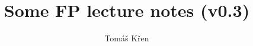 \documentclass[a4paper,oneside]{memoir}
\title{Some FP lecture notes (v0.3)}
\author{Tomáš Křen}
\begin{document}
\theoremstyle{plain} 
\newtheorem{theorem}{Theorem} 
\newtheorem{proposition}{Proposition} 
\newtheorem{lemma}{Lemma} 
\newtheorem{preLemma}{Pre-Lemma} 
\newtheorem*{corollary}{Corollary}

\theoremstyle{definition} 
\newtheorem*{definition}{Definition} 
\newtheorem*{preDefinition}{Pre-Definition} 
\newtheorem{conjecture}{Conjecture}
\newtheorem*{example}{Example} 

\theoremstyle{remark} 
\newtheorem*{remark}{Remark} 
\newtheorem*{note}{Note} 
\newtheorem{case}{Case}

\frontmatter
\mainmatter
\maketitle


\tableofcontents*

\newcommand{\red}[1]{{\color{red} #1}}



\newcommand{\sigmaPr}{\sigma^\prime}
\newcommand{\tauPr}{\tau^\prime}
\newcommand{\xPr}{x^\prime}
\newcommand{\nPr}{n^\prime}
\newcommand{\nPrr}{n^{\prime\prime}}
\newcommand{\nPrrr}{n^{\prime\prime\prime}}
\newcommand{\tausPr}{\tau_s^\prime}
\newcommand{\s}{\sigma}
\newcommand{\Th}{\theta}
\newcommand{\sPr}{\sigmaPr}
\newcommand{\thPr}{\theta^\prime}



\newcommand{\then}{\Rightarrow}
\newcommand{\E}[2]{(\exists #1)\ #2}
\newcommand{\A}[2]{(\forall #1)\ #2}
\newcommand{\Ain}[3]{(\forall #1 \in #2)\ #3}


\newcommand{\op}{\operatorname}

\newcommand{\ar}{\rightarrow}
\newcommand{\ap}[2]{(#1\,#2)}
\newcommand{\defi}{\coloneqq}
\newcommand{\defe}{\mathrel{\vcentcolon\equiv}}

\newcommand{\unaRule}[2]{\dfrac{#1}{#2}}
\newcommand{\binRule}[3]{\dfrac{#1 ~ ~ ~ ~ ~ ~ ~ #2}{#3}}
\newcommand{\triRule}[4]{\dfrac{#1 ~ ~ ~ ~ ~ ~ ~ #2 ~ ~ ~ ~ ~ ~ ~ #3}{#4}}
\newcommand{\isSub}[1]{#1\ \mathit{substitution}}
\newcommand{\MGU}[2]{\op{MGU}(#1,#2)}
\newcommand{\mgu}[1]{\op{MGU}(#1)}

\newcommand{\AX}{\textit{AX}\xspace}
\newcommand{\subAx}{\textit{SUB-AX}\xspace}
\newcommand{\mguMp}{\textit{MGU-MP}\xspace}
\newcommand{\abs}[1]{\lvert #1 \rvert}

\newcommand{\Pseudokod}[4]{
	\begin{figure}[!t]
	\removelatexerror
	\begin{algorithm}[H]
		\caption{\label{#4}#1}
		\DontPrintSemicolon
		\SetKwProg{Fn}{function}{}{}
		\Fn{#2}{#3}
	\end{algorithm}
	\end{figure}
}
\end{document}
